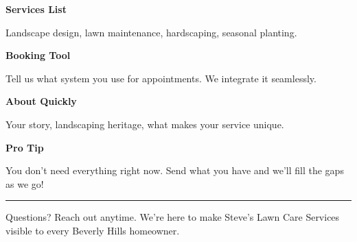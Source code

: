 \documentclass[11pt,letterpaper]{article}
\begin{document}
\begin{minipage}[t]{0.48\textwidth}
\begin{tcolorbox}[colframe=accent-teal, boxrule=1pt, left=0.7em, right=0.7em, top=0.5em, bottom=0.5em, arc=4pt, boxsep=0pt]
{\bfseries\small\color{accent-teal}Services List}

\vspace{0.15em}

{\small Landscape design, lawn maintenance, hardscaping, seasonal planting.}
\end{tcolorbox}

\vspace{0.1em}

\begin{tcolorbox}[colframe=accent-teal, boxrule=1pt, left=0.7em, right=0.7em, top=0.5em, bottom=0.5em, arc=4pt, boxsep=0pt]
{\bfseries\small\color{accent-teal}Booking Tool}

\vspace{0.15em}

{\small Tell us what system you use for appointments. We integrate it seamlessly.}
\end{tcolorbox}

\vspace{0.1em}

\begin{tcolorbox}[colframe=accent-teal, boxrule=1pt, left=0.7em, right=0.7em, top=0.5em, bottom=0.5em, arc=4pt, boxsep=0pt]
{\bfseries\small\color{accent-teal}About Quickly}

\vspace{0.15em}

{\small Your story, landscaping heritage, what makes your service unique.}
\end{tcolorbox}

\vspace{-0.2em}
\end{minipage}

\vspace{0.15em}

\begin{tcolorbox}[colback={accent-red!5}, colframe=accent-red!20, boxrule=0.5pt, left=0.7em, right=0.7em, top=0.4em, bottom=0.4em, arc=6pt, boxsep=0pt]

{\bfseries\small\color{accent-red}Pro Tip}

\vspace{0.1em}

{\small You don't need everything right now. Send what you have and we'll fill the gaps as we go!}

\end{tcolorbox}

\vspace{0.15em}

\noindent\hrule
\vspace{0.2em}

{\small\color{text-light}Questions? Reach out anytime. We're here to make Steve's Lawn Care Services visible to every Beverly Hills homeowner.}
\end{document}
